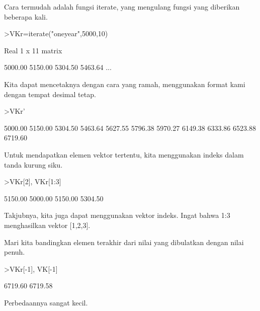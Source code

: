 \documentclass[a4paper,10pt]{article}
\begin{document}
\begin{eulernotebook}
\begin{eulercomment}
\begin{eulercomment}
\begin{eulercomment}
\begin{eulercomment}
\begin{eulercomment}
\begin{eulercomment}
\begin{eulercomment}
\begin{eulercomment}
\begin{eulercomment}
Cara termudah adalah fungsi iterate, yang mengulang fungsi yang
diberikan beberapa kali.
\end{eulercomment}
\begin{eulerprompt}
>VKr=iterate("oneyear",5000,10)
\end{eulerprompt}
\begin{euleroutput}
  Real 1 x 11 matrix
  
      5000.00     5150.00     5304.50     5463.64     ...
\end{euleroutput}
\begin{eulercomment}
Kita dapat mencetaknya dengan cara yang ramah, menggunakan format kami
dengan tempat desimal tetap.
\end{eulercomment}
\begin{eulerprompt}
>VKr'
\end{eulerprompt}
\begin{euleroutput}
      5000.00 
      5150.00 
      5304.50 
      5463.64 
      5627.55 
      5796.38 
      5970.27 
      6149.38 
      6333.86 
      6523.88 
      6719.60 
\end{euleroutput}
\begin{eulercomment}
Untuk mendapatkan elemen vektor tertentu, kita menggunakan indeks
dalam tanda kurung siku.
\end{eulercomment}
\begin{eulerprompt}
>VKr[2], VKr[1:3]
\end{eulerprompt}
\begin{euleroutput}
      5150.00 
      5000.00     5150.00     5304.50 
\end{euleroutput}
\begin{eulercomment}
Takjubnya, kita juga dapat menggunakan vektor indeks. Ingat bahwa 1:3
menghasilkan vektor [1,2,3].

Mari kita bandingkan elemen terakhir dari nilai yang dibulatkan dengan
nilai penuh.
\end{eulercomment}
\begin{eulerprompt}
>VKr[-1], VK[-1]
\end{eulerprompt}
\begin{euleroutput}
      6719.60 
      6719.58 
\end{euleroutput}
\begin{eulercomment}
Perbedaannya sangat kecil.


\end{eulercomment}
\end{eulercomment}
\end{eulercomment}
\end{eulercomment}
\end{eulercomment}
\end{eulercomment}
\end{eulercomment}
\end{eulercomment}
\end{eulercomment}
\end{eulernotebook}
\end{document}
